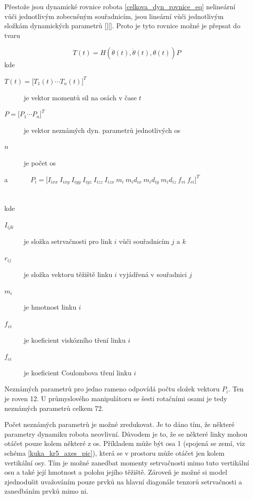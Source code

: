 Přestože jsou dynamické rovnice robota \ref{celkova_dyn_rovnice_eq} nelineární vůči jednotlivým zobecněným souřadnicím, jsou lineární vůči jednotlivým složkám dynamických parametrů [\cite{}][\cite{}]. Proto je tyto rovnice možné je přepsat do tvaru

\begin{equation}
T(t) = H(\ddot{\theta}(t),\dot{\theta}(t),\theta(t))P
\label{eq_lin_par}
\end{equation}
kde
\begin{description}
\item[$T(t) = {\big[T_1(t)  \dotsm  T_n(t)\big]}^{T}$] je vektor momentů sil na osách v čase $t$ 
\item[$P = {\big[P_1  \dotsm  P_n\big]}^{T}$] je vektor neznámých dyn. parametrů jednotlivých os
\item[$n$] je počet os
\end{description} \noindent
a \ \ \ \ \ \ $P_i = {\big[I_{ixx} \ I_{ixy} \ I_{iyy} \ I_{iyz} \ I_{izz} \ I_{izx} \ m_i \ m_id_{ix} \ m_id_{iy} \ m_id_{iz} \ f_{vi} \ f_{ci}\big]}^{T}$ \\
\\
\\
kde
\noindent
\begin{description}
\item[$I_{ijk}$] je složka setrvačnosti pro link $i$ vůči souřadnicím $j$ a $k$
\item[$r_{ij}$] je složka vektoru těžiště linku $i$ vyjádřená v souřadnici $j$
\item[$m_{i}$] je hmotnost linku $i$
\item[$f_{vi}$] je koeficient viskózního tření linku $i$
\item[$f_{ci}$] je koeficient Coulombova tření linku $i$
\end{description}

Neznámých parametrů pro jedno rameno odpovídá počtu složek vektoru $P_i$. Ten je roven 12. U průmyslového manipulátoru se šesti rotačními osami je tedy neznámých parametrů celkem 72. 

Počet neznámých parametrů je možné zredukovat. Je to dáno tím, že některé parametry dynamiku robota neovlivní. Důvodem je to, že se některé linky mohou otáčet pouze kolem některé z os. Příkladem může být osa 1 (spojená se zemí, viz schéma \ref{kuka_kr5_axes_pic}), která se v prostoru může otáčet jen kolem vertikální osy. Tím je možné zanedbat momenty setrvačnosti mimo tuto vertikální osu a také její hmotnost a polohu jejího těžiště. Zároveň je možné si model zjednodušit uvažováním pouze prvků na hlavní diagonále tenzorů setrvačnosti a zanedbáním prvků mimo ni.

